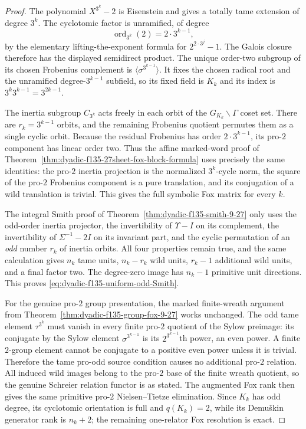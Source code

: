 \begin{proof}
The polynomial
$X^{3^k}-2$
is Eisenstein
and gives a
totally tame
extension of
degree $3^k$.
The cyclotomic
factor is
unramified,
of degree
\[
\operatorname{ord}_{3^k}(2)
=2\cdot3^{k-1},
\]
by the elementary
lifting-the-exponent
formula for
$2^{2\cdot3^j}-1$.
The Galois
closure therefore
has the displayed
semidirect product.
The unique
order-two subgroup
of its chosen
Frobenius
complement is
$\langle\sigma^{3^{k-1}}\rangle$.
It fixes the
chosen radical
root and
the unramified
degree-$3^{k-1}$
subfield, so
its fixed field
is $K_k$ and
its index is
$3^k3^{k-1}
=3^{2k-1}$.

The inertia
subgroup
$C_{3^k}$
acts freely
in each orbit
of the
$G_{K_k}\backslash\Gamma$
coset set.
There are
$r_k=3^{k-1}$
orbits, and
the remaining
Frobenius quotient
permutes them
as a single
cyclic orbit.
Because the
residual Frobenius
has order
$2\cdot3^{k-1}$,
its pro-$2$
component has
linear order
two.
Thus the affine
marked-word
proof of
Theorem~\ref{thm:dyadic-f135-27sheet-fox-block-formula}
uses precisely
the same
identities:
the pro-$2$
inertia projection
is the normalized
$3^k$-cycle norm,
the square of
the pro-$2$
Frobenius
component is
a pure translation,
and its conjugation
of a wild translation
is trivial.
This gives
the full
symbolic Fox
matrix for
every $k$.

The integral
Smith proof of
Theorem~\ref{thm:dyadic-f135-smith-9-27}
only uses the
odd-order inertia
projector,
the invertibility
of $\Upsilon-I$
on its complement,
the invertibility
of $\Sigma^{-1}-2I$
on its invariant
part, and the
cyclic permutation
of an
\emph{odd} number
$r_k$ of inertia
orbits.
All four
properties remain
true, and the
same calculation
gives $n_k$
tame units,
$n_k-r_k$
wild units,
$r_k-1$
additional
wild units,
and a final
factor two.
The degree-zero
image has
$n_k-1$
primitive
unit directions.
This proves
\eqref{eq:dyadic-f135-uniform-odd-Smith}.

For the genuine
pro-$2$ group
presentation,
the marked
finite-wreath
argument from
Theorem~\ref{thm:dyadic-f135-group-fox-9-27}
works unchanged.
The odd tame
element $\tau^{3^k}$
must vanish
in every finite
pro-$2$ quotient
of the Sylow
preimage:
its conjugate
by the Sylow
element
$\sigma^{3^{k-1}}$
is its
$2^{3^{k-1}}$th
power, an
even power.
A finite
$2$-group
element cannot
be conjugate
to a positive
even power
unless it is
trivial.
Therefore
the tame pro-odd
source condition
causes no
additional
pro-$2$
relation.
All induced
wild images
belong to the
pro-$2$ base
of the finite
wreath quotient,
so the genuine
Schreier relation
functor is
as stated.
The augmented
Fox rank then
gives the
same primitive
pro-$2$
Nielsen--Tietze
elimination.
Since $K_k$
has odd
degree,
its cyclotomic
orientation
is full and
$q(K_k)=2$,
while its
Demu\v{s}kin
generator rank
is $n_k+2$;
the remaining
one-relator
Fox resolution
is exact.


\end{proof}

